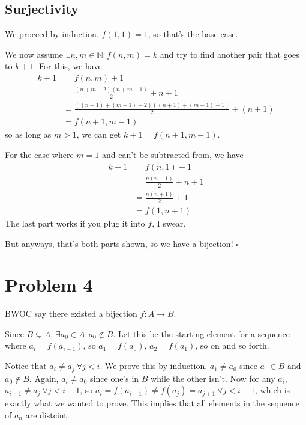 \documentclass[12pt]{article}
\newcommand{\N}{\mathbb{N}}
\begin{document}
\subsection{Surjectivity}

We proceed by induction.
$f(1, 1)=1$, so that's the base case.

We now assume $\exists n, m \in \N: f(n, m)=k$
and try to find another pair that goes to $k+1$.
For this, we have
\begin{align*}
  k+1
   & = f(n, m)+1                                      \\
   & = \frac{(n+m-2)(n+m-1)}{2}+n+1                   \\
   & = \frac{((n+1)+(m-1)-2)((n+1)+(m-1)-1)}{2}+(n+1) \\
   & = f(n+1, m-1)
\end{align*}
so as long as $m > 1$, we can get $k+1=f(n+1, m-1)$.

For the case where $m=1$ and can't be subtracted from, we have
\begin{align*}
  k+1
   & = f(n, 1)+1            \\
   & = \frac{n(n-1)}{2}+n+1 \\
   & = \frac{n(n+1)}{2}+1   \\
   & = f(1, n+1)
\end{align*}
The last part works if you plug it into $f$, I swear.

But anyways, that's both parts shown, so we have a bijection! $\square$

\pagebreak

\section{Problem 4}

BWOC say there existed a bijection $f: A \to B$.

Since $B \subsetneq A$, $\exists a_0 \in A: a_0 \notin B$.
Let this be the starting element for a sequence where $a_i=f(a_{i-1})$,
so $a_1=f(a_0)$, $a_2=f(a_1)$, so on and so forth.

Notice that $a_i \ne a_j\ \forall j < i$.
We prove this by induction.
$a_1 \ne a_0$ since $a_1 \in B$ and $a_0 \notin B$.
Again, $a_i \ne a_0$ since one's in $B$ while the other isn't.
Now for any $a_i$, $a_{i-1} \ne a_j\ \forall j < i-1$,
so $a_i=f(a_{i-1}) \ne f(a_j)=a_{j+1}\ \forall j < i-1$,
which is exactly what we wanted to prove.
This implies that all elements in the sequence of $a_n$ are distcint.
\end{document}
